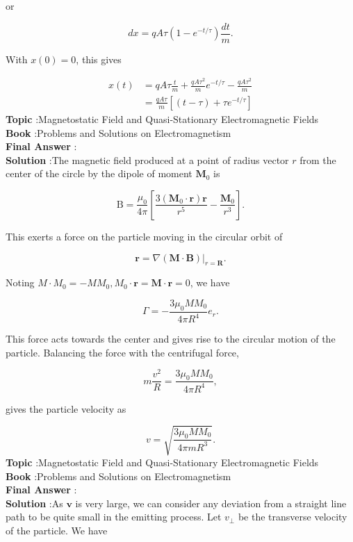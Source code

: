 \documentclass[10pt]{article}
\begin{document}
or

$$
d x=q A \tau\left(1-e^{-t / \tau}\right) \frac{d t}{m} .
$$

With $x(0)=0$, this gives

$$
\begin{aligned}
x(t) &=q A \tau \frac{t}{m}+\frac{q A \tau^{2}}{m} e^{-t / \tau}-\frac{q A \tau^{2}}{m} \\
&=\frac{q A \tau}{m}\left[(t-\tau)+\tau e^{-t / \tau}\right]
\end{aligned}
$$
\textbf{Topic} :Magnetostatic Field and Quasi-Stationary Electromagnetic Fields\\
\textbf{Book} :Problems and Solutions on Electromagnetism\\
\textbf{Final Answer} :\\


\textbf{Solution} :The magnetic field produced at a point of radius vector $r$ from the center of the circle by the dipole of moment $\mathbf{M}_{0}$ is

$$
\mathrm{B}=\frac{\mu_{0}}{4 \pi}\left[\frac{3\left(\mathbf{M}_{0} \cdot \mathbf{r}\right) \mathbf{r}}{r^{5}}-\frac{\mathbf{M}_{0}}{r^{3}}\right] .
$$

This exerts a force on the particle moving in the circular orbit of

$$
\mathbf{r}=\left.\nabla(\mathbf{M} \cdot \mathbf{B})\right|_{r=\boldsymbol{R}} .
$$

Noting $M \cdot M_{0}=-M M_{0}, M_{0} \cdot \mathbf{r}=\mathbf{M} \cdot \mathbf{r}=0$, we have

$$
\Gamma=-\frac{3 \mu_{0} M M_{0}}{4 \pi R^{4}} e_{r} .
$$

This force acts towards the center and gives rise to the circular motion of the particle. Balancing the force with the centrifugal force,

$$
m \frac{v^{2}}{R}=\frac{3 \mu_{0} M M_{0}}{4 \pi R^{4}},
$$

gives the particle velocity as

$$
v=\sqrt{\frac{3 \mu_{0} M M_{0}}{4 \pi m R^{3}}} .
$$
\textbf{Topic} :Magnetostatic Field and Quasi-Stationary Electromagnetic Fields\\
\textbf{Book} :Problems and Solutions on Electromagnetism\\
\textbf{Final Answer} :\\


\textbf{Solution} :As $\mathbf{v}$ is very large, we can consider any deviation from a straight line path to be quite small in the emitting process. Let $v_{\perp}$ be the transverse velocity of the particle. We have
\end{document}
